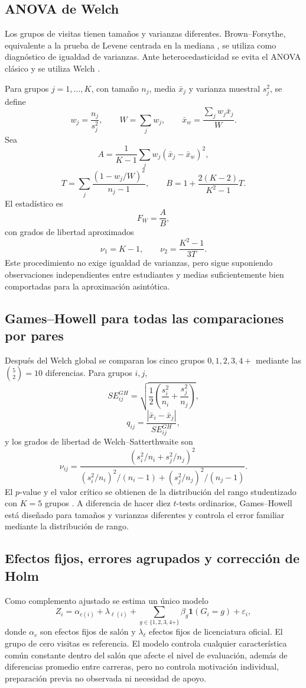 \documentclass[11pt,letterpaper]{article}
\begin{document}
\subsection{ANOVA de Welch}

Los grupos de visitas tienen tamaños y varianzas diferentes. Brown--Forsythe, equivalente a la prueba de Levene centrada en la mediana \citep{brownforsythe1974}, se utiliza como diagnóstico de igualdad de varianzas. Ante heterocedasticidad se evita el ANOVA clásico y se utiliza Welch \citep{welch1951}.

Para grupos $j=1,\dots,K$, con tamaño $n_j$, media $\bar x_j$ y varianza muestral $s_j^2$, se define
\[
w_j=\frac{n_j}{s_j^2},\qquad W=\sum_jw_j,\qquad \bar x_w=\frac{\sum_jw_j\bar x_j}{W}.
\]
Sea
\[
A=\frac{1}{K-1}\sum_j w_j(\bar x_j-\bar x_w)^2,
\]
\[
T=\sum_j\frac{(1-w_j/W)^2}{n_j-1},\qquad
B=1+\frac{2(K-2)}{K^2-1}T.
\]
El estadístico es
\[
F_W=\frac{A}{B},
\]
con grados de libertad aproximados
\[
\nu_1=K-1,\qquad \nu_2=\frac{K^2-1}{3T}.
\]
Este procedimiento no exige igualdad de varianzas, pero sigue suponiendo observaciones independientes entre estudiantes y medias suficientemente bien comportadas para la aproximación asintótica.

\subsection{Games--Howell para todas las comparaciones por pares}

Después del Welch global se comparan los cinco grupos $0,1,2,3,4+$ mediante las $\binom52=10$ diferencias. Para grupos $i,j$,
\[
SE_{ij}^{GH}=\sqrt{\frac12\left(\frac{s_i^2}{n_i}+\frac{s_j^2}{n_j}\right)},
\]
\[
q_{ij}=\frac{|\bar x_i-\bar x_j|}{SE_{ij}^{GH}},
\]
y los grados de libertad de Welch--Satterthwaite son
\[
\nu_{ij}=\frac{(s_i^2/n_i+s_j^2/n_j)^2}
{(s_i^2/n_i)^2/(n_i-1)+(s_j^2/n_j)^2/(n_j-1)}.
\]
El $p$-value y el valor crítico se obtienen de la distribución del rango studentizado con $K=5$ grupos \citep{gameshowell1976}. A diferencia de hacer diez $t$-tests ordinarios, Games--Howell está diseñado para tamaños y varianzas diferentes y controla el error familiar mediante la distribución de rango.

\subsection{Efectos fijos, errores agrupados y corrección de Holm}

Como complemento ajustado se estima un único modelo
\[
Z_i=\alpha_{c(i)}+\lambda_{\ell(i)}+\sum_{g\in\{1,2,3,4+\}}\beta_g\mathbf1(G_i=g)+\varepsilon_i,
\]
donde $\alpha_c$ son efectos fijos de salón y $\lambda_\ell$ efectos fijos de licenciatura oficial. El grupo de cero visitas es referencia. El modelo controla cualquier característica común constante dentro del salón que afecte el nivel de evaluación, además de diferencias promedio entre carreras, pero no controla motivación individual, preparación previa no observada ni necesidad de apoyo.
\end{document}
